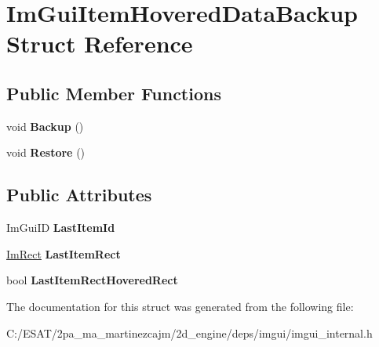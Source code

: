 \hypertarget{struct_im_gui_item_hovered_data_backup}{}\section{Im\+Gui\+Item\+Hovered\+Data\+Backup Struct Reference}
\label{struct_im_gui_item_hovered_data_backup}
\subsection*{Public Member Functions}
\begin{DoxyCompactItemize}
\item 
\mbox{\label{struct_im_gui_item_hovered_data_backup_a2084500d9cbc9455e52fbe87c95f2315}} 
void {\bfseries Backup} ()
\item 
\mbox{\label{struct_im_gui_item_hovered_data_backup_a4d807799df14f74bde55482134b076cc}} 
void {\bfseries Restore} ()
\end{DoxyCompactItemize}
\subsection*{Public Attributes}
\begin{DoxyCompactItemize}
\item 
\mbox{\label{struct_im_gui_item_hovered_data_backup_a5e0b18013d983269deba7976666fc501}} 
Im\+Gui\+ID {\bfseries Last\+Item\+Id}
\item 
\mbox{\label{struct_im_gui_item_hovered_data_backup_ae489c222bed561950104a46ddf1387f3}} 
\hyperlink{struct_im_rect}{Im\+Rect} {\bfseries Last\+Item\+Rect}
\item 
\mbox{\label{struct_im_gui_item_hovered_data_backup_a48dd47c573d5299de25be908d77f23f0}} 
bool {\bfseries Last\+Item\+Rect\+Hovered\+Rect}
\end{DoxyCompactItemize}


The documentation for this struct was generated from the following file\+:\begin{DoxyCompactItemize}
\item 
C\+:/\+E\+S\+A\+T/2pa\+\_\+ma\+\_\+martinezcajm/2d\+\_\+engine/deps/imgui/imgui\+\_\+internal.\+h\end{DoxyCompactItemize}
